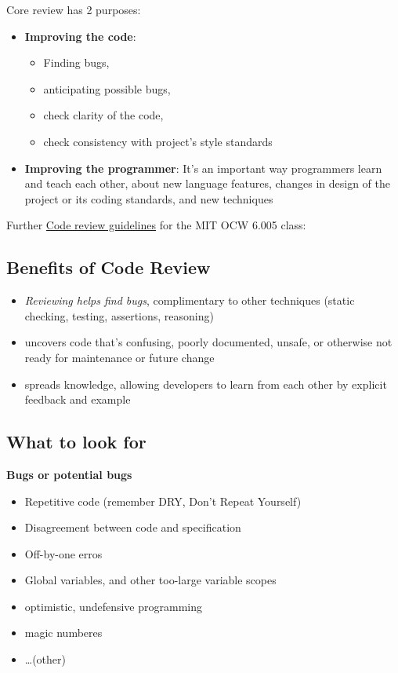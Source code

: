 \documentclass[10pt]{amsart}
\begin{document}
Core review has 2 purposes:
\begin{itemize}
	\item \textbf{Improving the code}:
	\begin{itemize}
		\item Finding bugs,
		\item anticipating possible bugs,
		\item check clarity of the code,
		\item check consistency with project's style standards
	\end{itemize}
	\item \textbf{Improving the programmer}: It's an important way programmers learn and teach each other, about new language features, changes in design of the project or its coding standards, and new techniques
\end{itemize}

Further \href{https://ocw.mit.edu/ans7870/6/6.005/s16/general/code-review.html}{Code review guidelines} for the MIT OCW 6.005 class:

\subsection{Benefits of Code Review}

\begin{itemize}
	\item \emph{Reviewing helps find bugs}, complimentary to other techniques (static checking, testing, assertions, reasoning)
	\item uncovers code that's confusing, poorly documented, unsafe, or otherwise not ready for maintenance or future change
	\item spreads knowledge, allowing developers to learn from each other by explicit feedback and example 
\end{itemize}

\subsection{What to look for}

\textbf{Bugs or potential bugs}
\begin{itemize}
	\item Repetitive code (remember DRY, Don't Repeat Yourself)
	\item Disagreement between code and specification
	\item Off-by-one erros
	\item Global variables, and other too-large variable scopes
	\item optimistic, undefensive programming
	\item magic numberes
	\item \dots (other)
\end{itemize}
\end{document}
